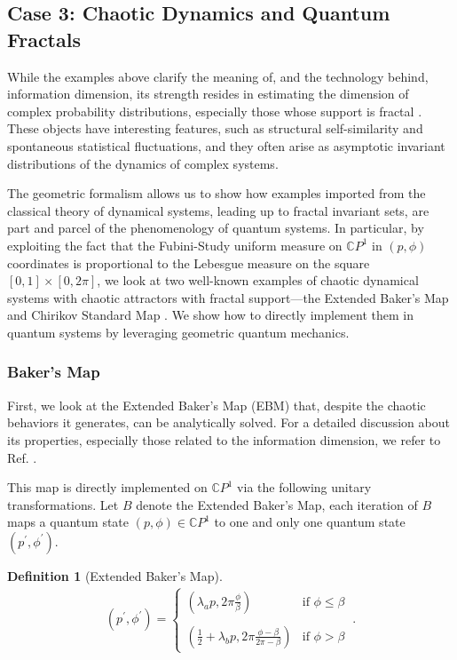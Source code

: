 \documentclass[draft,nofootinbib,pre,twocolumn,showkeys,superscriptaddress,preprintnumbers,floatfix]{revtex4-1}
\newtheorem{definition}{Definition}
\newcommand{\1}{\mathbbm{1}}
\begin{document}
\subsection{Case 3: Chaotic Dynamics and Quantum Fractals}
\label{sec:Example3}

While the examples above clarify the meaning of, and the technology behind,
information dimension, its strength resides in estimating the dimension of
complex probability distributions, especially those whose support is fractal
\cite{Beck93,Dorf99a,Feld12}. These objects have interesting features, such as
structural self-similarity and spontaneous statistical fluctuations, and
they often arise as asymptotic invariant distributions of the dynamics of
complex systems.

The geometric formalism allows us to show how examples imported from the
classical theory of dynamical systems, leading up to fractal invariant sets,
are part and parcel of the phenomenology of quantum systems. In particular, by
exploiting the fact that the Fubini-Study uniform measure on $\mathbb{C}P^1$ in
$(p,\phi)$ coordinates is proportional to the Lebesgue measure on the square
$[0,1] \times [0,2\pi]$, we look at two well-known examples of chaotic
dynamical systems with chaotic attractors with fractal support---the Extended
Baker's Map \cite{Farm83} and Chirikov Standard Map \cite{Chir79}. We show how
to directly implement them in quantum systems by leveraging geometric quantum
mechanics.

\subsubsection{Baker's Map}

First, we look at the Extended Baker's Map (EBM) that, despite the chaotic
behaviors it generates, can be analytically solved. For a detailed discussion
about its properties, especially those related to the information dimension, we
refer to Ref. \cite{Farm83}.

This map is directly implemented on $\mathbb{C}P^1$ via the following unitary
transformations. Let $B$ denote the Extended Baker's Map, each iteration of $B$
maps a quantum state $(p,\phi) \in \mathbb{C}P^1$ to one and only one quantum
state $\left(p^\prime,\phi^\prime\right)$.

\begin{definition}[Extended Baker's Map]
\begin{align*}
\left(p^\prime,\phi^\prime\right) =
  \left\{
  \begin{array}{ll}
 \left( \lambda_a p,2\pi\frac{\phi}{\beta}\right) & \textrm{if $\phi \leq \beta $}\\
 & \\
 \left( \frac{1}{2}+\lambda_b p,2\pi\frac{\phi - \beta}{2\pi-\beta}\right) & \textrm{if $\phi > \beta$}
\end{array} \right.
  ~.
\end{align*}
\end{definition}
\end{document}
